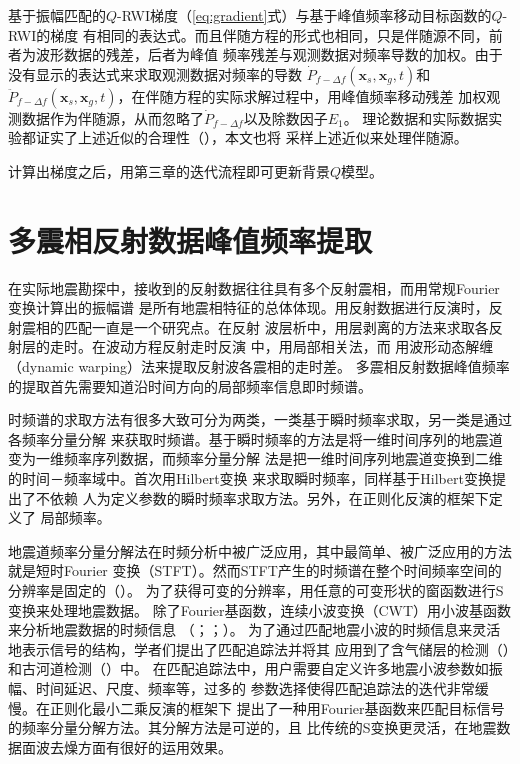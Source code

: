 基于振幅匹配的$Q$-RWI梯度（\ref{eq:gradient}式）与基于峰值频率移动目标函数的$Q$-RWI的梯度
有相同的表达式。而且伴随方程的形式也相同，只是伴随源不同，前者为波形数据的残差，后者为峰值
频率残差与观测数据对频率导数的加权。由于没有显示的表达式来求取观测数据对频率的导数
$\dot{P}_{f-\Delta f}(\mathbf{x}_s,\mathbf{x}_g,t)$和$\ddot{P}_{f-\Delta f}(\mathbf{x}_s,
\mathbf{x}_g,t)$，在伴随方程的实际求解过程中，用峰值频率移动残差
加权观测数据作为伴随源，从而忽略了$\dot{P}_{f-\Delta f}$以及除数因子$E_1$。
理论数据和实际数据实验都证实了上述近似的合理性（），本文也将
采样上述近似来处理伴随源。

计算出梯度之后，用第三章的迭代流程即可更新背景$Q$模型。


\vspace{0.5cm}
\section{多震相反射数据峰值频率提取}
\vspace{0.5cm}
在实际地震勘探中，接收到的反射数据往往具有多个反射震相，而用常规Fourier变换计算出的振幅谱
是所有地震相特征的总体体现。用反射数据进行反演时，反射震相的匹配一直是一个研究点。在反射
波层析中，用层剥离的方法来求取各反射层的走时。在波动方程反射走时反演
中，用局部相关法，而
用波形动态解缠（dynamic warping）法来提取反射波各震相的走时差。
多震相反射数据峰值频率的提取首先需要知道沿时间方向的局部频率信息即时频谱。

时频谱的求取方法有很多大致可分为两类，一类基于瞬时频率求取，另一类是通过各频率分量分解
来获取时频谱。基于瞬时频率的方法是将一维时间序列的地震道变为一维频率序列数据，而频率分量分解
法是把一维时间序列地震道变换到二维的时间－频率域中。首次用Hilbert变换
来求取瞬时频率，同样基于Hilbert变换提出了不依赖
人为定义参数的瞬时频率求取方法。另外，在正则化反演的框架下定义了
局部频率。

地震道频率分量分解法在时频分析中被广泛应用，其中最简单、被广泛应用的方法就是短时Fourier
变换（STFT）。然而STFT产生的时频谱在整个时间频率空间的分辨率是固定的（）。
为了获得可变的分辨率，用任意的可变形状的窗函数进行S变换来处理地震数据。
除了Fourier基函数，连续小波变换（CWT）用小波基函数来分析地震数据的时频信息
（；；）。
为了通过匹配地震小波的时频信息来灵活地表示信号的结构，学者们提出了匹配追踪法并将其
应用到了含气储层的检测（）和古河道检测（）中。
在匹配追踪法中，用户需要自定义许多地震小波参数如振幅、时间延迟、尺度、频率等，过多的
参数选择使得匹配追踪法的迭代非常缓慢。在正则化最小二乘反演的框架下
提出了一种用Fourier基函数来匹配目标信号的频率分量分解方法。其分解方法是可逆的，且
比传统的S变换更灵活，在地震数据面波去燥方面有很好的运用效果。

